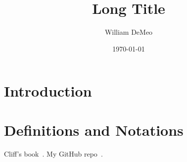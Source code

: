 \documentclass[11pt]{amsart}
\numberwithin{equation}{section}
\theoremstyle{plain}
\theoremstyle{definition}
\begin{document}
\title[short title]{Long Title}
\date{\today}
\author[W.~DeMeo]{William DeMeo}
\address{Iowa State University}


\maketitle


\section{Introduction}
\label{sec:introduction}

\section{Definitions and Notations}
\label{sec:defin-notat}

Cliff's book~\cite{MR2839398}.
My GitHub repo~\cite{overalgebras-github}.

\printbibliography
\end{document}
